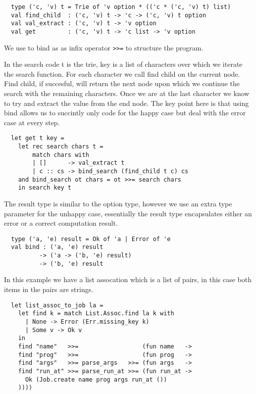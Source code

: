 \documentclass[a4paper,10pt]{article}
\begin{document}
\begin{verbatim}
  type ('c, 'v) t = Trie of 'v option * (('c * ('c, 'v) t) list)
  val find_child  : ('c, 'v) t -> 'c -> ('c, 'v) t option
  val val_extract : ('c, 'v) t -> 'v option
  val get         : ('c, 'v) t -> 'c list -> 'v option
\end{verbatim}

We use to bind as as infix operator \texttt{>>=} to structure the program.

In the search code t is the trie, key is a list of characters over which
we iterate the search function. For each character we call find child on
the current node. Find child, if succesful, will return the next node
upon which we continue the search with the remaining characters. Once we
are at the last character we know to try and extract the value from the end
node. The key point here is that using bind allows us to succintly only code
for the happy case but deal with the error case at every step.

\begin{verbatim}
  let get t key =
    let rec search chars t =
        match chars with
        | []      -> val_extract t
        | c :: cs -> bind_search (find_child t c) cs
    and bind_search ot chars = ot >>= search chars
    in search key t
\end{verbatim}

The result type is similar to the option type, however we use an extra type
parameter for the unhappy case, essentially the result type encapsulates 
either an error or a correct computation result.

\begin{verbatim}
  type ('a, 'e) result = Ok of 'a | Error of 'e
  val bind : ('a, 'e) result
          -> ('a -> ('b, 'e) result)
          -> ('b, 'e) result
\end{verbatim}

In this example we have a list assocation which is a list of pairs, in this case both
items in the pairs are strings.

\begin{verbatim}
  let list_assoc_to_job la =
    let find k = match List.Assoc.find la k with
      | None -> Error (Err.missing_key k)
      | Some v -> Ok v
    in
    find "name"   >>=                  (fun name   ->
    find "prog"   >>=                  (fun prog   ->
    find "args"   >>= parse_args   >>= (fun args   ->
    find "run_at" >>= parse_run_at >>= (fun run_at ->
      Ok (Job.create name prog args run_at ())
    ))))
\end{verbatim}
\end{document}
